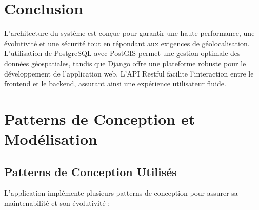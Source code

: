 \section{Conclusion}
L'architecture du système est conçue pour garantir une haute performance, une évolutivité et une sécurité tout en répondant aux exigences de géolocalisation. L'utilisation de PostgreSQL avec PostGIS permet une gestion optimale des données géospatiales, tandis que Django offre une plateforme robuste pour le développement de l'application web. L'API Restful facilite l'interaction entre le frontend et le backend, assurant ainsi une expérience utilisateur fluide.

\section{Patterns de Conception et Modélisation}

\subsection{Patterns de Conception Utilisés}
L'application implémente plusieurs patterns de conception pour assurer sa maintenabilité et son évolutivité :

